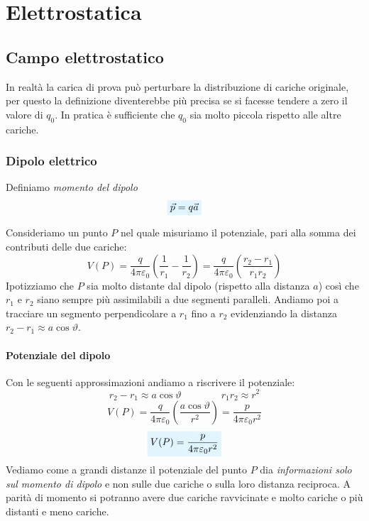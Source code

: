 \documentclass[x11names]{report}
\begin{document}
	

\tableofcontents
\newpage
	
\chapter{Elettrostatica}
\section{Campo elettrostatico}
In realtà la carica di prova può perturbare la distribuzione di cariche originale, per questo la definizione diventerebbe più precisa se si facesse tendere a zero il valore di \(q_0\). In pratica è sufficiente che \(q_0\) sia molto piccola rispetto alle altre cariche.


\subsection{Dipolo elettrico}
Definiamo \textit{momento del dipolo}
\begin{equation}
	\viola{\vec{p} = q\vec{a}}
\end{equation}


Consideriamo un punto \(P\) nel quale misuriamo il potenziale, pari alla somma dei contributi delle due cariche:
\[
V(P) = \frac{q}{4\pi \varepsilon_0} \left(\frac{1}{r_1} - \frac{1}{r_2}\right) = \frac{q}{4\pi \varepsilon_0} \left(\frac{r_2 - r_1}{r_1r_2}\right)
\]
Ipotizziamo che \(P\) sia molto distante dal dipolo (rispetto alla distanza \(a\)) così che \(r_1\) e \(r_2\) siano sempre più assimilabili a due segmenti paralleli. Andiamo poi a tracciare un segmento perpendicolare a \(r_1\) fino a \(r_2\) evidenziando la distanza \(r_2 - r_1 \approx a\cos\vartheta\). 
\begin{figure}[h]
	\centering
\end{figure}
\subsubsection{Potenziale del dipolo}
Con le seguenti approssimazioni andiamo a riscrivere il potenziale:
\[
r_2 - r_1 \approx a\cos\vartheta \qquad \qquad r_1r_2 \approx r^2
\]
\[
V(P) = \frac{q}{4\pi \varepsilon_0} \left(\frac{a\cos\vartheta}{r^2}\right) = \frac{p}{4\pi \varepsilon_0 r^2}
\]
\begin{equation}
	\viola{V(P) =\frac{p}{4\pi \varepsilon_0 r^2}}
\end{equation}
Vediamo come a grandi distanze il potenziale del punto \(P\) dia \textit{informazioni solo sul momento di dipolo} e non sulle due cariche o sulla loro distanza reciproca. A parità di momento si potranno avere due cariche ravvicinate e molto cariche o più distanti e meno cariche.
\end{document}

